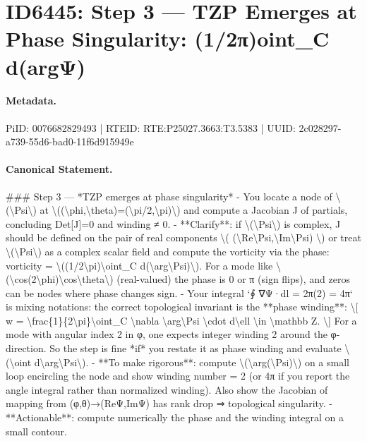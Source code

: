 \section*{ID6445: Step 3 — TZP Emerges at Phase Singularity: (1/2π)oint\_C d(argΨ)}
\paragraph{Metadata.}
PiID: 0076682829493 | RTEID: RTE:P25027.3663:T3.5383 | UUID: 2c028297-a739-55d6-bad0-11f6d915949e

\paragraph{Canonical Statement.}
\#\#\# Step 3 — *TZP emerges at phase singularity* - You locate a node of \textbackslash{}(\textbackslash{}Psi\textbackslash{}) at \textbackslash{}((\textbackslash{}phi,\textbackslash{}theta)=(\textbackslash{}pi/2,\textbackslash{}pi)\textbackslash{}) and compute a Jacobian J of partials, concluding Det[J]=0 and winding ≠ 0. - **Clarify**: if \textbackslash{}(\textbackslash{}Psi\textbackslash{}) is complex, J should be defined on the pair of real components \textbackslash{}( (\textbackslash{}Re\textbackslash{}Psi,\textbackslash{}Im\textbackslash{}Psi) \textbackslash{}) or treat \textbackslash{}(\textbackslash{}Psi\textbackslash{}) as a complex scalar field and compute the vorticity via the phase: vorticity = \textbackslash{}((1/2\textbackslash{}pi)\textbackslash{}oint\_C d(\textbackslash{}arg\textbackslash{}Psi)\textbackslash{}). For a mode like \textbackslash{}(\textbackslash{}cos(2\textbackslash{}phi)\textbackslash{}cos\textbackslash{}theta\textbackslash{}) (real-valued) the phase is 0 or π (sign flips), and zeros can be nodes where phase changes sign. - Your integral `∮ ∇Ψ·dl = 2π(2) = 4π` is mixing notations: the correct topological invariant is the **phase winding**: \textbackslash{}[ w = \textbackslash{}frac\{1\}\{2\textbackslash{}pi\}\textbackslash{}oint\_C \textbackslash{}nabla \textbackslash{}arg\textbackslash{}Psi \textbackslash{}cdot d\textbackslash{}ell \textbackslash{}in \textbackslash{}mathbb Z. \textbackslash{}] For a mode with angular index 2 in φ, one expects integer winding 2 around the φ-direction. So the step is fine *if* you restate it as phase winding and evaluate \textbackslash{}(\textbackslash{}oint d\textbackslash{}arg\textbackslash{}Psi\textbackslash{}). - **To make rigorous**: compute \textbackslash{}(\textbackslash{}arg(\textbackslash{}Psi)\textbackslash{}) on a small loop encircling the node and show winding number = 2 (or 4π if you report the angle integral rather than normalized winding). Also show the Jacobian of mapping from (φ,θ)→(ReΨ,ImΨ) has rank drop ⇒ topological singularity. - **Actionable**: compute numerically the phase and the winding integral on a small contour.

